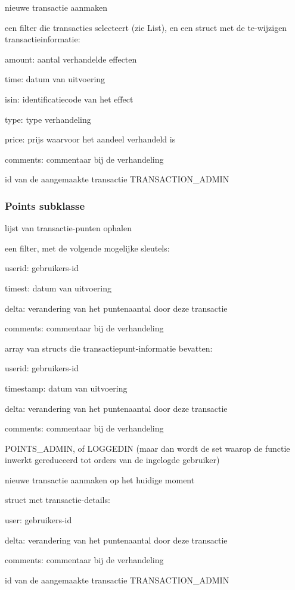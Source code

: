 	{ nieuwe transactie aanmaken }
	{ een filter die transacties selecteert (zie List), en een struct met de te-wijzigen transactieinformatie:
		\begin{itemize_compact}
		\item{amount: aantal verhandelde effecten}
		\item{time: datum van uitvoering}
		\item{isin: identificatiecode van het effect}
		\item{type: type verhandeling}
		\item{price: prijs waarvoor het aandeel verhandeld is}
		\item{comments: commentaar bij de verhandeling}
		\end{itemize_compact} }
	{ id van de aangemaakte transactie }
	{ TRANSACTION\_ADMIN }


\subsubsection{Points subklasse}

	{ lijst van transactie-punten ophalen }
	{ een filter, met de volgende mogelijke sleutels:
		\begin{itemize_compact}
		\item{userid: gebruikers-id}
		\item{timest: datum van uitvoering}
		\item{delta: verandering van het puntenaantal door deze transactie}
		\item{comments: commentaar bij de verhandeling}
		\end{itemize_compact} }
	{ array van structs die transactiepunt-informatie bevatten:
		\begin{itemize_compact}
		\item{userid: gebruikers-id}
		\item{timestamp: datum van uitvoering}
		\item{delta: verandering van het puntenaantal door deze transactie}
		\item{comments: commentaar bij de verhandeling}
		\end{itemize_compact} }
	{ POINTS\_ADMIN, of LOGGEDIN (maar dan wordt de set waarop de functie inwerkt gereduceerd tot orders van de ingelogde gebruiker) }

	{ nieuwe transactie aanmaken op het huidige moment }
	{ struct met transactie-details:
		\begin{itemize_compact}
		\item{user: gebruikers-id}
		\item{delta: verandering van het puntenaantal door deze transactie}
		\item{comments: commentaar bij de verhandeling}
		\end{itemize_compact} }
	{ id van de aangemaakte transactie }
	{ TRANSACTION\_ADMIN }

